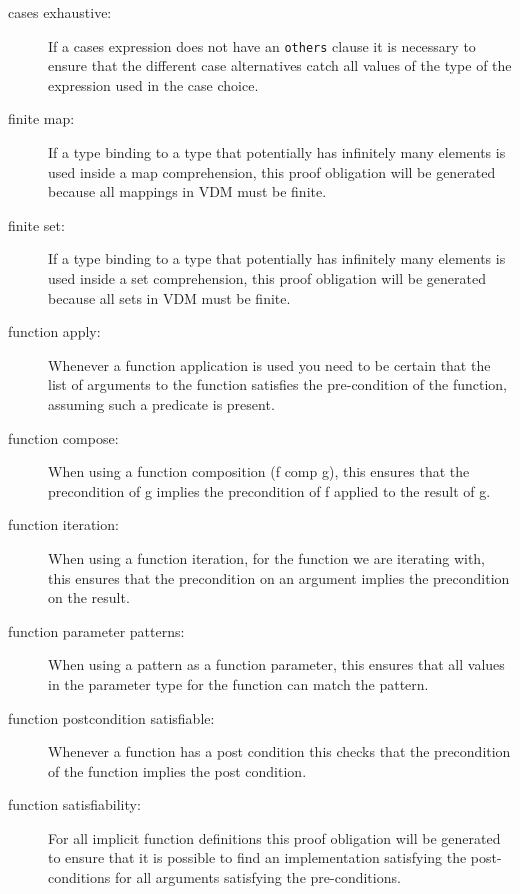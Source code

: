 \begin{description}

\item[cases exhaustive:] If a cases expression does not have an
  \texttt{others} clause it is necessary to ensure that the
  different case alternatives catch all values of the type of the
  expression used in the case choice.

\item[finite map:] If a type binding to a type that potentially has
  infinitely many elements is used inside a map comprehension, this
  proof obligation will be generated because all mappings in VDM must be finite.

\item[finite set:] If a type binding to a type that potentially has
  infinitely many elements is used inside a set comprehension, this
  proof obligation will be generated because all sets in VDM must be finite.

\item[function apply:] Whenever a function application is used you need to be
  certain that the list of arguments to the function satisfies the
  pre-condition of the function, assuming such a predicate is present.

\item[function compose:] When using a function composition (f comp g), this ensures
    that the precondition of g implies the precondition of f applied to the result
    of g.

\item[function iteration:] When using a function iteration, for the function we
    are iterating with, this ensures that the precondition on an argument implies
    the precondition on the result.

\item[function parameter patterns:] When using a pattern as a function
    parameter, this ensures that all values in the parameter type for the
    function can match the pattern.

\item[function postcondition satisfiable:] Whenever a function has a post condition this checks that 
    the precondition of the function implies the post condition.

\item[function satisfiability:] For all implicit function definitions
  this proof obligation will be generated to ensure that it is
  possible to find an implementation satisfying the post-conditions for all
  arguments satisfying the pre-conditions.


\end{description}
